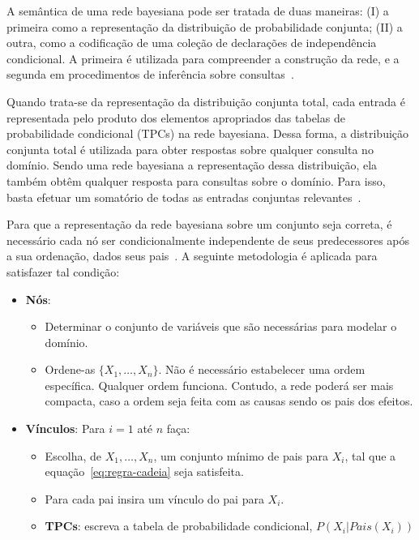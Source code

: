 A semântica de uma rede bayesiana pode ser tratada de duas maneiras: (I) a primeira como a representação da distribuição de probabilidade conjunta; (II) a outra, como a codificação de uma coleção de declarações de independência condicional. A primeira é utilizada para compreender a construção da rede, e a segunda em procedimentos de inferência sobre consultas~\cite{russell:2002}.

Quando trata-se da representação da distribuição conjunta total, cada entrada é representada pelo produto dos elementos apropriados das tabelas de probabilidade condicional (TPCs) na rede bayesiana. Dessa forma, a distribuição conjunta total é utilizada para obter respostas sobre qualquer consulta no domínio. Sendo uma rede bayesiana a representação dessa distribuição, ela também obtêm qualquer resposta para consultas sobre o domínio. Para isso, basta efetuar um somatório de todas as entradas conjuntas relevantes~\cite{russell:2002}.

Para que a representação da rede bayesiana sobre um conjunto seja correta, é necessário cada nó ser condicionalmente independente de seus predecessores após a sua ordenação, dados seus pais~\cite{russell:2002}. A seguinte metodologia é aplicada para satisfazer tal condição:

\begin{itemize}
    \item \textbf{Nós}:
    \begin{itemize}
        \item Determinar o conjunto de variáveis que são necessárias para modelar o domínio.
        \item Ordene-as $\{ X_1, \dots, X_n\}$. Não é necessário estabelecer uma ordem específica. Qualquer ordem funciona. Contudo, a rede poderá ser mais compacta, caso a ordem seja feita com as causas sendo os pais dos efeitos.
    \end{itemize}
    \item \textbf{Vínculos}: Para $i = 1$ até $n$ faça:
    \begin{itemize}
        \item Escolha, de $X_1, \dots, X_n$, um conjunto mínimo de pais para $X_i$, tal que a equação~\ref{eq:regra-cadeia} seja satisfeita.
        \item Para cada pai insira um vínculo do pai para $X_i$.
        \item \textbf{TPCs}: escreva a tabela de probabilidade condicional, $P(X_i|Pais(X_i))$
    \end{itemize}
\end{itemize}

